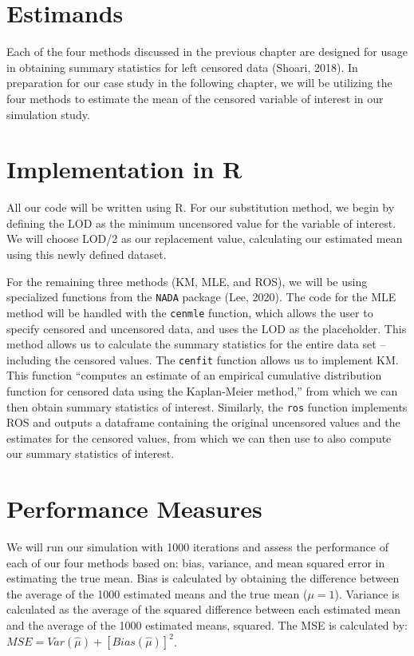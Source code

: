 \documentclass[12pt, twoside]{amherstthesis}
\begin{document}
\hypertarget{estimands}{%
\section{Estimands}\label{estimands}}

Each of the four methods discussed in the previous chapter are designed for usage in obtaining summary statistics for left censored data (Shoari, 2018). In preparation for our case study in the following chapter, we will be utilizing the four methods to estimate the mean of the censored variable of interest in our simulation study.

\hypertarget{implementation}{%
\section{Implementation in R}\label{implementation}}

All our code will be written using R. For our substitution method, we begin by defining the LOD as the minimum uncensored value for the variable of interest. We will choose LOD/2 as our replacement value, calculating our estimated mean using this newly defined dataset.

For the remaining three methods (KM, MLE, and ROS), we will be using specialized functions from the \texttt{NADA} package (Lee, 2020). The code for the MLE method will be handled with the \texttt{cenmle} function, which allows the user to specify censored and uncensored data, and uses the LOD as the placeholder. This method allows us to calculate the summary statistics for the entire data set -- including the censored values. The \texttt{cenfit} function allows us to implement KM. This function ``computes an estimate of an empirical cumulative distribution function for censored data using the Kaplan-Meier method,'' from which we can then obtain summary statistics of interest. Similarly, the \texttt{ros} function implements ROS and outputs a dataframe containing the original uncensored values and the estimates for the censored values, from which we can then use to also compute our summary statistics of interest.

\hypertarget{performance_measures}{%
\section{Performance Measures}\label{performance_measures}}

We will run our simulation with 1000 iterations and assess the performance of each of our four methods based on: bias, variance, and mean squared error in estimating the true mean. Bias is calculated by obtaining the difference between the average of the 1000 estimated means and the true mean (\(\mu = 1\)). Variance is calculated as the average of the squared difference between each estimated mean and the average of the 1000 estimated means, squared. The MSE is calculated by: \(MSE = Var(\hat{\mu})+[Bias(\hat{\mu})]^2\).
\end{document}
